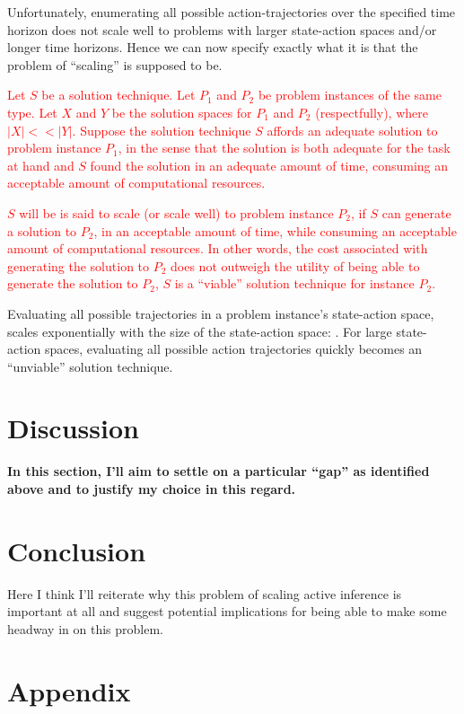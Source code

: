 \documentclass[onecolumn]{IEEEtran}
\begin{document}
Unfortunately, enumerating all possible action-trajectories over the specified time horizon does not scale well to problems with larger state-action spaces
and/or longer time horizons. Hence we can now specify exactly what it is that the problem of ``scaling'' is supposed to be. 

\textcolor{red}{Let $S$ be a solution technique. Let $P_1$ and $P_2$ be problem instances of the same type. Let $X$ and $Y$ be the solution spaces for $P_1$ and $P_2$ (respectfully), where $|X| << |Y|$. Suppose the solution technique $S$ affords an adequate solution to problem instance $P_1$, in the sense that the solution is both adequate for the task at hand and $S$ found the solution in an adequate amount of time, consuming an acceptable amount of computational resources.}

\textcolor{red}{$S$ will be is said to scale (or scale well) to problem instance $P_2$, if $S$ can generate a solution to $P_2$, in an acceptable amount of time, while consuming an acceptable amount of computational resources. In other words, the cost associated with generating the solution to $P_2$ does not outweigh the utility of being able to generate the solution to $P_2$, $S$ is a ``viable'' solution technique for instance $P_2$.}

Evaluating all possible trajectories in a problem instance's state-action space, scales exponentially with the size of the state-action space: \textcite{Applications-of-FEP-Machine-Learning-Neuroscience}. For large state-action spaces, evaluating all possible action trajectories quickly becomes an ``unviable'' solution technique.

\section{Discussion}
\textbf{In this section, I'll aim to settle on a particular ``gap'' as identified above and to justify my choice in this regard.}

\section{Conclusion}

Here I think I'll reiterate why this problem of scaling active inference is important at all and suggest potential implications for being able to make some headway in on this problem. 

\appendix
\section{Appendix}
\end{document}

